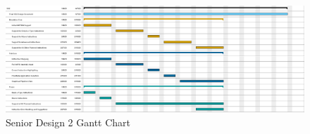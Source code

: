 \documentclass[parskip=half, fontsize=12pt]{scrartcl}
\begin{document}
\begin{figure}[H]
    \centering
    \includegraphics[width=\textwidth]{gantt-sd2}
    \caption{Senior Design 2 Gantt Chart}
\end{figure}
\clearpage




\end{document}
